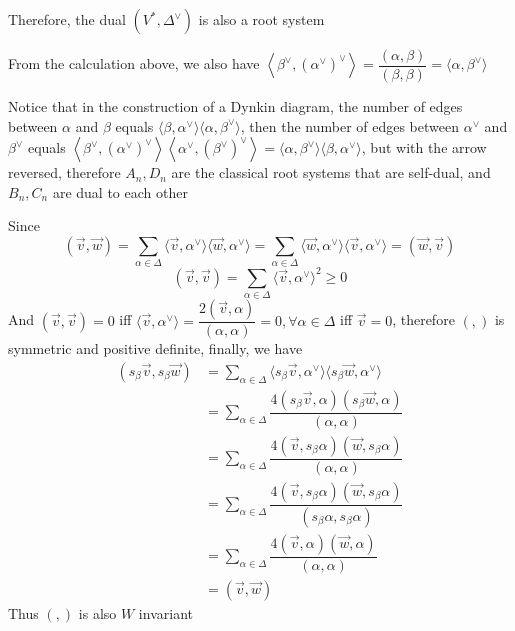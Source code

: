 \documentclass[main]{subfiles}
\begin{document}
Therefore, the dual $(V^*,\Delta^\vee)$ is also a root system \par
From the calculation above, we also have $\left\langle\beta^\vee,\left(\alpha^\vee\right)^\vee\right\rangle=\dfrac{(\alpha,\beta)}{(\beta,\beta)}=\langle\alpha,\beta^\vee\rangle$ \par
Notice that in the construction of a Dynkin diagram, the number of edges between $\alpha$ and $\beta$ equals $\langle\beta,\alpha^\vee\rangle\langle\alpha,\beta^\vee\rangle$, then the number of edges between $\alpha^\vee$ and $\beta^\vee$ equals $\left\langle\beta^\vee,\left(\alpha^\vee\right)^\vee\right\rangle\left\langle\alpha^\vee,\left(\beta^\vee\right)^\vee\right\rangle=\langle\alpha,\beta^\vee\rangle\langle\beta,\alpha^\vee\rangle$, but with the arrow reversed, therefore $A_n,D_n$ are the classical root systems that are self-dual, and $B_n,C_n$ are dual to each other \par

\begin{exercise}
\begin{enumerate}[label=(\alph*),leftmargin=*]

\end{enumerate}
\end{exercise}

Since$$(\vec{v},\vec{w})=\displaystyle\sum_{\alpha\in\Delta}\langle\vec{v},\alpha^\vee\rangle\langle\vec{w},\alpha^\vee\rangle=\sum_{\alpha\in\Delta}\langle\vec{w},\alpha^\vee\rangle\langle\vec{v},\alpha^\vee\rangle=(\vec{w},\vec{v})$$ $$(\vec{v},\vec{v})=\displaystyle\sum_{\alpha\in\Delta}\langle\vec{v},\alpha^\vee\rangle^2\geq0$$And $(\vec{v},\vec{v})=0$ iff $\langle\vec{v},\alpha^\vee\rangle=\dfrac{2(\vec{v},\alpha)}{(\alpha,\alpha)}=0,\forall\alpha\in\Delta$ iff $\vec{v}=0$, therefore $(,)$ is symmetric and positive definite, finally, we have \begin{align*}
(s_\beta\vec{v},s_\beta\vec{w})&=\displaystyle\sum_{\alpha\in\Delta}\langle s_\beta\vec{v},\alpha^\vee\rangle\langle s_\beta\vec{w},\alpha^\vee\rangle \\
&=\sum_{\alpha\in\Delta}\dfrac{4(s_\beta\vec{v},\alpha)(s_\beta\vec{w},\alpha)}{(\alpha,\alpha)} \\
&=\sum_{\alpha\in\Delta}\dfrac{4(\vec{v},s_\beta\alpha)(\vec{w},s_\beta\alpha)}{(\alpha,\alpha)} \\
&=\sum_{\alpha\in\Delta}\dfrac{4(\vec{v},s_\beta\alpha)(\vec{w},s_\beta\alpha)}{(s_\beta\alpha,s_\beta\alpha)} \\
&=\sum_{\alpha\in\Delta}\dfrac{4(\vec{v},\alpha)(\vec{w},\alpha)}{(\alpha,\alpha)} \\
&=(\vec{v},\vec{w})
\end{align*}Thus $(,)$ is also $W$ invariant \par
\end{document}
